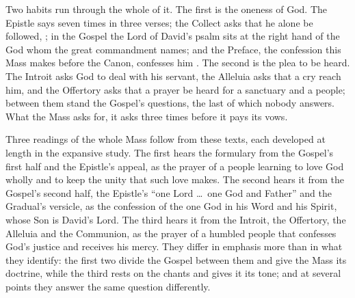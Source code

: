 Two habits run through the whole of it. The first is the oneness of God. The
Epistle says  seven times in three verses; the Collect asks that he
alone be followed, ; in the Gospel the Lord of David's
psalm sits at the right hand of the God whom the great commandment names; and
the Preface, the confession this Mass makes before the Canon, confesses him
. The
second is the plea to be heard. The Introit asks God to deal with his servant,
the Alleluia asks that a cry reach him, and the Offertory asks that a prayer be
heard for a sanctuary and a people; between them stand the Gospel's questions,
the last of which nobody answers. What the Mass asks for, it asks three times
before it pays its vows.

Three readings of the whole Mass follow from these texts, each developed at
length in the expansive study. The first hears the formulary from the
Gospel's first half and the Epistle's appeal, as the prayer of a people
learning to love God wholly and to keep the unity that such love makes. The
second hears it from the Gospel's second half, the Epistle's ``one Lord \dots\
one God and Father'' and the Gradual's versicle, as the confession of the one
God in his Word and his Spirit, whose Son is David's Lord. The third hears it
from the Introit, the Offertory, the Alleluia and the Communion, as the prayer
of a humbled people that confesses God's justice and receives his mercy.
They differ in emphasis more than in what they identify: the first two divide
the Gospel between them and give the Mass its doctrine, while the third rests
on the chants and gives it its tone; and at several points they answer the
same question differently.
